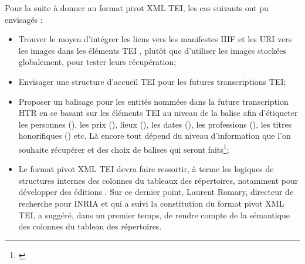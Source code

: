 Pour la suite à donner au format pivot XML TEI, les cas suivants ont pu envisagés :
\begin{itemize}
    \item Trouver le moyen d'intégrer les liens vers les manifestes IIIF et les URI vers les images dans les éléments TEI , plutôt que d'utiliser les images stockées globalement, pour tester leurs récupération;\\
    \item Envisager une structure d'accueil TEI pour les futures transcriptions TEI;\\
    \item Proposer un balisage pour les entités nommées dans la future transcription HTR en se basant sur les éléments TEI au niveau de la balise  afin d'étiqueter les personnes (), les prix (), lieux (), les dates (), les professions (), les titres honorifiques () etc. Là encore tout dépend du niveau d'information que l'on souhaite récupérer et des choix de balises qui seront faits\footnote{\cite{le_pevedic_retour_2016}};\\
    \item Le format pivot XML TEI devra faire ressortir, à terme les logiques de structures internes des colonnes du tableaux des répertoires, notamment pour développer des éditions . Sur ce dernier point, Laurent Romary, directeur de recherche pour INRIA et qui a suivi la constitution du format pivot XML TEI, a suggéré, dans un premier temps, de rendre compte de la sémantique des colonnes du tableau des répertoires. 
    

\end{itemize}
